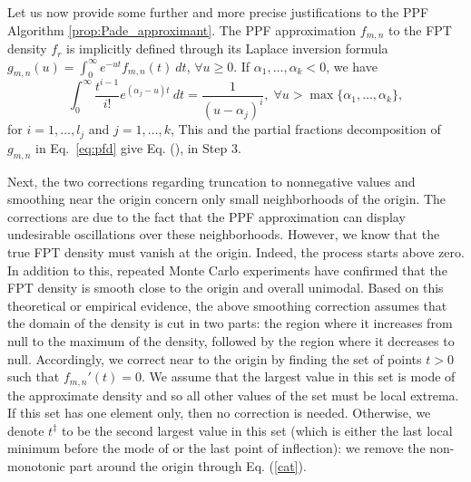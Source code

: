 \documentclass[preprint,12pt]{elsarticle}
\numberwithin{equation}{section}
\theoremstyle{plain} \newtheorem{theorem}{Theorem}[section]
\theoremstyle{plain} \newtheorem{proposition}[theorem]{Proposition}
\theoremstyle{plain} \newtheorem{lemma}[theorem]{Lemma}
\theoremstyle{plain} \newtheorem{corollary}[theorem]{Corollary}
\theoremstyle{definition} \newtheorem{definition}[theorem]{Definition}
\theoremstyle{definition} \newtheorem{notation}[theorem]{Notation}
\theoremstyle{remark} \newtheorem{remark}[theorem]{Remark}
\theoremstyle{remark} \newtheorem{remarks}[theorem]{Remarks}
\theoremstyle{remark} \newtheorem{algorithm2}[theorem]{Algorithm}
\theoremstyle{remark} \newtheorem{example}[theorem]{Example}
\begin{document}
Let us now provide some further and more precise justifications to the
PPF Algorithm \ref{prop:Pade_approximant}.
The PPF approximation $f_{m,n}$ to the FPT density $f_r$ is
implicitly defined through its Laplace inversion formula
$g_{m,n}(u)=\int_0^\infty e^{-ut} f_{m,n}(t)\ dt$,
    $\forall u \ge 0$.
If $\alpha_1,\ldots,\alpha_k<0$, we have
\begin{equation*}
    \int_0^\infty \frac{t^{i-1}}{i!}  e^{(\alpha_j-u)t}\ dt=\frac{1}{(u-\alpha_j)^i},\;\forall  u > \max\{\alpha_1,\ldots,\alpha_k\},
\end{equation*}
for $i= 1, \dots, l_j$ and 
    $j=1,\dots, k$, 
    This and the partial fractions decomposition 
    of $g_{m,n}$
    in Eq.~\eqref{eq:pfd}
give Eq. (), in Step 3.

Next, the two corrections regarding
truncation to nonnegative values and
smoothing near the origin
concern only small neighborhoods of the origin.
The corrections are due to the fact that the PPF approximation can display
undesirable oscillations 
over these neighborhoods. However, we know that the true FPT density must vanish at the origin. 
Indeed, the process starts above zero. In addition to this,
repeated Monte Carlo experiments have confirmed that the FPT 
density is smooth close to the origin and overall unimodal.
Based on this theoretical or empirical evidence, 
the above smoothing correction assumes that the domain of the 
density is cut in two parts: the region where it increases from null
to the maximum of the density,
followed by the region where it decreases to null.
Accordingly, we correct near to the origin 
by finding the set of points $t>0$ such that $f_{m,n}'(t) = 0$.
We assume that the largest value in this set is mode of the 
approximate density and so
all other values of the set must be local extrema. If this set has one element only, then no correction is needed.
Otherwise, we denote $t^\ddag$ to be 
the second largest value in this set (which is either the last local minimum before the mode of or the last point of inflection): we remove
the non-monotonic part around the origin through Eq. (\ref{cat}). 
\end{document}
